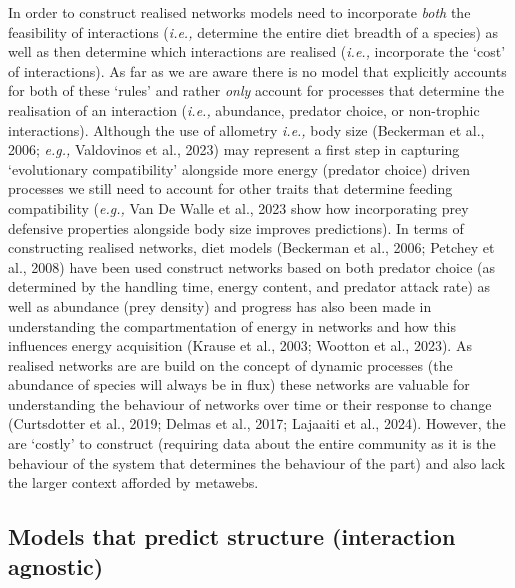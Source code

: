 \documentclass[
]{article}
\begin{document}
In order to construct realised networks models need to incorporate
\emph{both} the feasibility of interactions (\emph{i.e.,} determine the
entire diet breadth of a species) as well as then determine which
interactions are realised (\emph{i.e.,} incorporate the `cost' of
interactions). As far as we are aware there is no model that explicitly
accounts for both of these `rules' and rather \emph{only} account for
processes that determine the realisation of an interaction (\emph{i.e.,}
abundance, predator choice, or non-trophic interactions). Although the
use of allometry \emph{i.e.,} body size (Beckerman et al., 2006;
\emph{e.g.,} Valdovinos et al., 2023) may represent a first step in
capturing `evolutionary compatibility' alongside more energy (predator
choice) driven processes we still need to account for other traits that
determine feeding compatibility (\emph{e.g.,} Van De Walle et al., 2023
show how incorporating prey defensive properties alongside body size
improves predictions). In terms of constructing realised networks, diet
models (Beckerman et al., 2006; Petchey et al., 2008) have been used
construct networks based on both predator choice (as determined by the
handling time, energy content, and predator attack rate) as well as
abundance (prey density) and progress has also been made in
understanding the compartmentation of energy in networks and how this
influences energy acquisition (Krause et al., 2003; Wootton et al.,
2023). As realised networks are are build on the concept of dynamic
processes (the abundance of species will always be in flux) these
networks are valuable for understanding the behaviour of networks over
time or their response to change (Curtsdotter et al., 2019; Delmas et
al., 2017; Lajaaiti et al., 2024). However, the are `costly' to
construct (requiring data about the entire community as it is the
behaviour of the system that determines the behaviour of the part) and
also lack the larger context afforded by metawebs.

\subsection{Models that predict structure (interaction
agnostic)}\label{models-that-predict-structure-interaction-agnostic}
\end{document}
